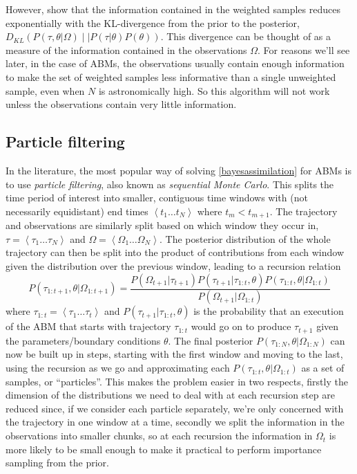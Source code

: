 \documentclass{article}
\begin{document}
However, \citet{chatterjee2018sample} show that the information contained in the weighted samples reduces exponentially with the KL-divergence from the prior to the posterior, $D_{KL}\left(P(\tau,\theta|\Omega) \mid\mid P(\tau|\theta)P(\theta) \right)$. This divergence can be thought of as a measure of the information contained in the observations $\Omega$. For reasons we'll see later, in the case of ABMs, the observations usually contain enough information to make the set of weighted samples less informative than a single unweighted sample, even when $N$ is astronomically high. So this algorithm will not work unless the observations contain very little information.

\subsection{Particle filtering}
In the literature, the most popular way of solving \eqref{bayesassimilation} for ABMs is to use \textit{particle filtering}, also known as \textit{sequential Monte Carlo}. This splits the time period of interest into smaller, contiguous time windows with (not necessarily equidistant) end times $\left<t_1 \dots t_N\right>$ where $t_m < t_{m+1}$. The trajectory and observations are similarly split based on which window they occur in, $\tau = \left<\tau_1 \dots \tau_N\right>$ and $\Omega = \left<\Omega_1 \dots \Omega_N\right>$. The posterior distribution of the whole trajectory can then be split into the product of contributions from each window given the distribution over the previous window, leading to a recursion relation
\begin{equation}
P\left(\tau_{1:t+1}, \theta | \Omega_{1:t+1}\right)
=
\frac{ P(\Omega_{t+1}|\tau_{t+1})
P(\tau_{t+1}|\tau_{1:t},\theta) P\left(\tau_{1:t},\theta| \Omega_{1:t}\right)
}
{	P(\Omega_{t+1}| \Omega_{1:t}) }
\label{bayesrecursion}
\end{equation}
where $\tau_{1:t} = \left<\tau_1 \dots \tau_t\right>$ and $P(\tau_{t+1}|\tau_{1:t},\theta)$ is the probability that an execution of the ABM that starts with trajectory $\tau_{1:t}$ would go on to produce $\tau_{t+1}$ given the parameters/boundary conditions $\theta$. The final posterior $P(\tau_{1:N},\theta|\Omega_{1:N})$ can now be built up in steps, starting with the first window and moving to the last, using the recursion as we go and approximating each $P(\tau_{1:t}, \theta | \Omega_{1:t})$ as a set of samples, or ``particles''. This makes the problem easier in two respects, firstly the dimension of the distributions we need to deal with at each recursion step are reduced since, if we consider each particle separately, we're only concerned with the trajectory in one window at a time, secondly we split the information in the observations into smaller chunks, so at each recursion the information in $\Omega_t$ is more likely to be small enough to make it practical to perform importance sampling from the prior.
\end{document}
